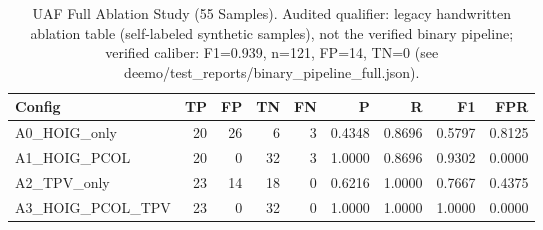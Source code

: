 \begin{table}[htbp]
\centering
\caption{UAF Full Ablation Study (55 Samples). Audited qualifier: legacy handwritten ablation table (self-labeled synthetic samples), not the verified binary pipeline; verified caliber: F1=0.939, n=121, FP=14, TN=0 (see deemo/test_reports/binary_pipeline_full.json).}
\label{tab:uaf_full_ablation}
\begin{tabular}{lrrrrrrrr}
\toprule
Config & TP & FP & TN & FN & P & R & F1 & FPR \\
\midrule
  A0_HOIG_only & 20 & 26 & 6 & 3 & 0.4348 & 0.8696 & 0.5797 & 0.8125 \\
  A1_HOIG_PCOL & 20 & 0 & 32 & 3 & 1.0000 & 0.8696 & 0.9302 & 0.0000 \\ %
  A2_TPV_only & 23 & 14 & 18 & 0 & 0.6216 & 1.0000 & 0.7667 & 0.4375 \\ %
  A3_HOIG_PCOL_TPV & 23 & 0 & 32 & 0 & 1.0000 & 1.0000 & 1.0000 & 0.0000 \\ %
\bottomrule
\end{tabular}
\end{table}
